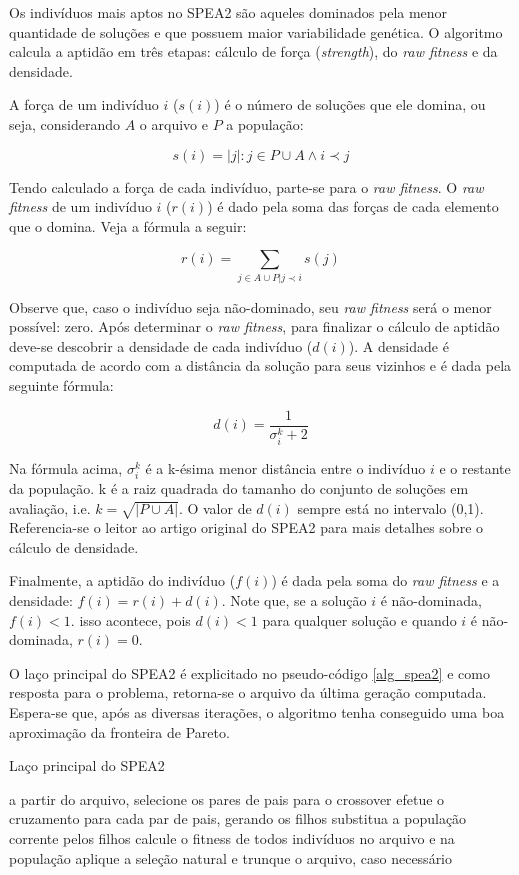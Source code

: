 Os indivíduos mais aptos no SPEA2 são aqueles dominados pela menor quantidade de soluções e que possuem maior variabilidade genética. O algoritmo calcula a aptidão em três etapas: cálculo de força (\textit{strength}), do \textit{raw fitness} e da densidade.

A força de um indivíduo $i$ ($s(i)$) é o número de soluções que ele domina, ou seja, considerando $A$ o arquivo e $P$ a população:

\[ s(i) = |j|: j \in P \cup A \land i \prec j \]

Tendo calculado a força de cada indivíduo, parte-se para o \textit{raw fitness}. O \textit{raw fitness} de um indivíduo $i$ ($r(i)$) é dado pela soma das forças de cada elemento que o domina. Veja a fórmula a seguir:

\[ r(i) = \sum_{j \in A \cup P | j \prec i} s(j) \]

Observe que, caso o indivíduo seja não-dominado, seu \textit{raw fitness} será o menor possível: zero. Após determinar o \textit{raw fitness}, para finalizar o cálculo de aptidão deve-se descobrir a densidade de cada indivíduo ($d(i)$). A densidade é computada de acordo com a distância da solução para seus vizinhos e é dada pela seguinte fórmula:

\[ d(i) = \frac{1}{\sigma_i^k + 2} \]

Na fórmula acima, $\sigma_i^k$ é a k-ésima menor distância entre o indivíduo $i$ e o restante da população. k é a raiz quadrada do tamanho do conjunto de soluções em avaliação, i.e. $k = \sqrt{|P \cup A|}$. O valor de $d(i)$ sempre está no intervalo (0,1). Referencia-se o leitor ao artigo original do SPEA2 \cite{Zitzler2002} para mais detalhes sobre o cálculo de densidade.

Finalmente, a aptidão do indivíduo ($f(i)$) é dada pela soma do \textit{raw fitness} e a densidade: $f(i) = r(i) + d(i)$. Note que, se a solução $i$ é não-dominada, $f(i) < 1$. isso acontece, pois $d(i) < 1$ para qualquer solução e quando $i$ é não-dominada, $r(i) = 0$.

O laço principal do SPEA2 é explicitado no pseudo-código \ref{alg_spea2} e como resposta para o problema, retorna-se o arquivo da última geração computada. Espera-se que, após as diversas iterações, o algoritmo tenha conseguido uma boa aproximação da fronteira de Pareto.

\begin{algorithm}
	\caption{Laço principal do SPEA2}
	\label{alg_spea2}
	\begin{algorithmic}[1]
		\State a partir do arquivo, selecione os pares de pais para o crossover
		\State efetue o cruzamento para cada par de pais, gerando os filhos
		\State substitua a população corrente pelos filhos
		\State calcule o fitness de todos indivíduos no arquivo e na população
		\State aplique a seleção natural e trunque o arquivo, caso necessário
		\EndWhile
	\end{algorithmic}
\end{algorithm}

